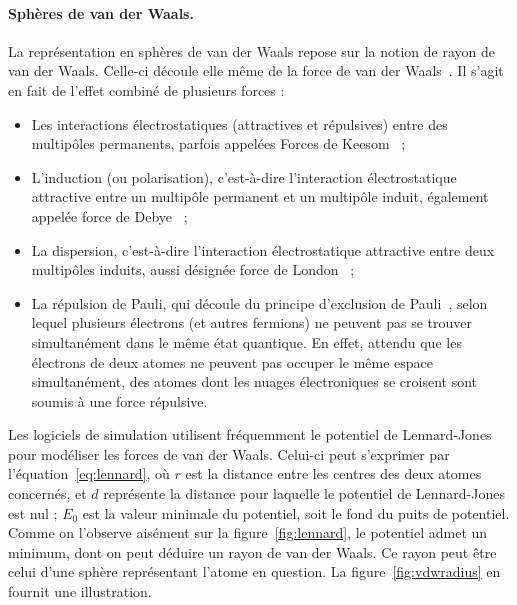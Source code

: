 	\paragraph{Sphères de van der Waals.} La représentation en sphères de van der Waals repose sur la notion de rayon de van der Waals. Celle-ci découle elle même de la force de van der Waals~\cite{dzyaloshinskii1961general}. Il s'agit en fait de l'effet combiné de plusieurs forces :
	
	\begin{itemize}
	    \item Les interactions électrostatiques (attractives et répulsives) entre des multipôles permanents, parfois appelées Forces de Keesom~\cite{keesom1915second} ;
		\item L'induction (ou polarisation), c'est-à-dire l'interaction électrostatique attractive entre un multipôle permanent et un multipôle induit, également appelée force de Debye~\cite{debye1913reprinted, debye1929polar} ;
	    \item La dispersion, c'est-à-dire l'interaction électrostatique attractive entre deux multipôles induits, aussi désignée force de London~\cite{eisenschitz1930verhaltnis, london1930theorie, london1937general} ;
		\item La répulsion de Pauli, qui découle du principe d'exclusion de Pauli~\cite{pauli1925zusammenhang}, selon lequel plusieurs électrons (et autres fermions) ne peuvent pas se trouver simultanément dans le même état quantique. En effet, attendu que les électrons de deux atomes ne peuvent pas occuper le même espace simultanément, des atomes dont les nuages électroniques se croisent sont soumis à une force répulsive.
	\end{itemize}
	
	Les logiciels de simulation utilisent fréquemment le potentiel de Lennard-Jones~\cite{lennard1924determination} pour modéliser les forces de van der Waals. Celui-ci peut s'exprimer par l'équation~\ref{eq:lennard}, où $r$ est la distance entre les centres des deux atomes concernés, et $d$ représente la distance pour laquelle le potentiel de Lennard-Jones est nul ; $E_{0}$ est la valeur minimale du potentiel, soit le \og fond \fg{} du puits de potentiel. Comme on l'observe aisément sur la figure~\ref{fig:lennard}, le potentiel admet un minimum, dont on peut déduire un rayon de van der Waals. Ce rayon peut être celui d'une sphère représentant l'atome en question. La figure~\ref{fig:vdwradius} en fournit une illustration.
		

